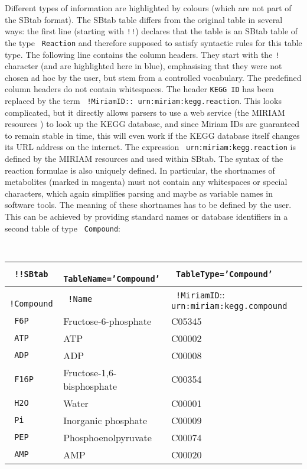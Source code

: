 \documentclass[a4paper]{article}
\newcommand{\tab}[1]{{\texttt{\color{red} #1}}}
\newcommand{\col}[1]{\texttt{\color{blue} #1}}
\newcommand{\defext}[1] {\texttt{\color{lightblue} #1}}
\newcommand{\nick}[1] {\texttt{\color{lila} #1}}
\begin{document}
Different types of information are highlighted by colours (which are
not part of the SBtab format). The SBtab table differs from the
original table in several ways: the first line (starting with
\texttt{!!})  declares that the table is an SBtab table of the type
\tab{Reaction} and therefore supposed to satisfy syntactic rules for
this table type. The following line contains the column headers.  They
start with the \texttt{!} character (and are highlighted here in
blue), emphasising that they were not chosen ad hoc by the user, but
stem from a controlled vocabulary. The predefined column headers do
not contain whitespaces.  The header \texttt{KEGG ID} has been
replaced by the term
\col{!MiriamID}\texttt{::}\defext{urn:miriam:kegg.reaction}.  This
looks complicated, but it directly allows parsers to use a web service
(the MIRIAM resources \cite{laibe2007miriam}) to look up the KEGG
database, and since Miriam IDs are guaranteed to remain stable in
time, this will even work if the KEGG database itself changes its URL
address on the internet.  The expression
\defext{urn:miriam:kegg.reaction} is defined by the MIRIAM resources
and used within SBtab.  The syntax of the reaction formulae is also
uniquely defined. In particular, the shortnames of metabolites (marked
in magenta) must not contain any whitespaces or special characters,
which again simplifies parsing and maybe as variable names in software
tools.  The meaning of these shortnames has to be defined by the user.
This can be achieved by providing standard names or database
identifiers in a second table of type \tab{Compound}:

\begin{center} {\tt \small
    \begin{tabular}{|l|l|l|}
\hline
    \tab{!!SBtab} & \tab{TableName='Compound'} & \tab{TableType='Compound'} \\
      \hline\hline
      \col{!Compound}&\col{!Name} & \col{!MiriamID}::\defext{urn:miriam:kegg.compound}\\
      \hline
      \nick{F6P} & Fructose-6-phosphate      & C05345 \\ \hline
      \nick{ATP} & ATP                       & C00002 \\ \hline
      \nick{ADP} & ADP                       & C00008 \\ \hline
      \nick{F16P}& Fructose-1,6-bisphosphate & C00354 \\ \hline
      \nick{H2O} & Water                     & C00001 \\ \hline
      \nick{Pi}  & Inorganic phosphate       & C00009 \\ \hline
      \nick{PEP} & Phosphoenolpyruvate       & C00074 \\ \hline
      \nick{AMP} & AMP                       & C00020 \\
      \hline
\end{tabular}
}
\end{center}
\end{document}
